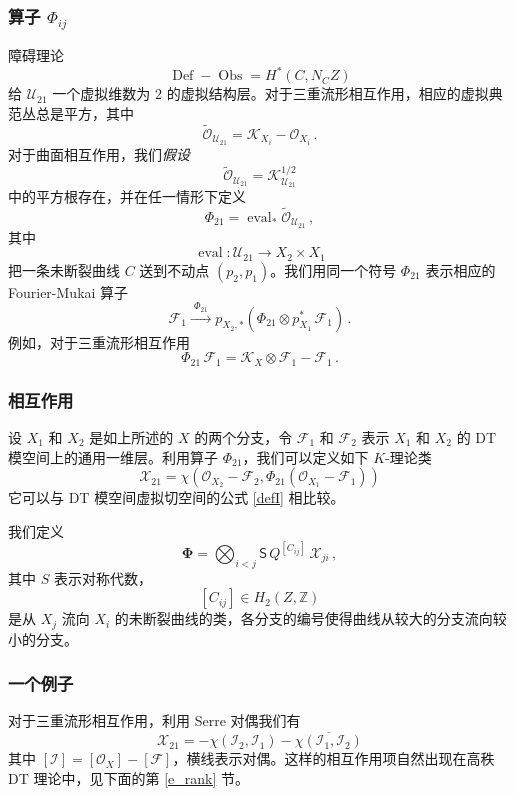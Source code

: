 \documentclass[12pt]{article}
\newcommand{\Z}{\mathbb{Z}}
\newcommand{\cO}{\mathscr{O}}
\DeclareMathOperator{\Def}{Def}
\DeclareMathOperator{\Obs}{Obs}
\DeclareMathOperator{\eval}{eval}
\newcommand{\cF}{\mathscr{F}}
\newcommand{\cI}{\mathscr{I}}
\newcommand{\cU}{\mathscr{U}}
\newcommand{\cX}{\mathscr{X}}
\newcommand{\tO}{\widetilde{\mathscr{O}}}
\newcommand{\bS}{\mathsf{S}}
\newcommand{\bPhi}{\boldsymbol{\Phi}}
\newcommand{\cK}{\mathscr{K}}
\theoremstyle{definition}
\begin{document}
\subsubsection{算子 $\Phi_{ij}$}

障碍理论
$$
\Def - \Obs = H^*(C,N_C Z)
$$
给 $\cU_{21}$ 一个虚拟维数为 $2$ 的虚拟结构层。对于三重流形相互作用，相应的虚拟典范丛总是平方，其中
$$
\tO_{\cU_{21}} = \cK_{X_i}- \cO_{X_i} \,.
$$
对于曲面相互作用，我们\emph{假设}
$$
\tO_{\cU_{21}}  = \cK^{1/2}_{\cU_{21}}
$$
中的平方根存在，并在任一情形下定义
$$
\Phi_{21} = \eval_*  \tO_{\cU_{21}} \,,
$$
其中
$$
\eval: \cU_{21} \to X_2 \times X_1
$$
把一条未断裂曲线 $C$ 送到不动点 $(p_2,p_1)$。我们用同一个符号 $\Phi_{21}$ 表示相应的 Fourier-Mukai 算子
$$
\cF_1 \xrightarrow{\,\,\Phi_{21}\,\,} p_{X_2,*}
\left(\Phi_{21} \otimes
p_{X_1}^* \, \cF_1 \right) \,.
$$
例如，对于三重流形相互作用
$$
\Phi_{21} \, \cF_1 = \cK_X \otimes \cF_1 - \cF_1 \,.
$$

\subsubsection{相互作用}\label{s_inter}

设 $X_1$ 和 $X_2$ 是如上所述的 $X$ 的两个分支，令 $\cF_1$ 和 $\cF_2$ 表示 $X_1$ 和 $X_2$ 的 DT 模空间上的通用一维层。利用算子 $\Phi_{21}$，我们可以定义如下 $K$-理论类
\begin{equation}
\cX_{21} = \chi(\cO_{X_2}-\cF_2, \Phi_{21} (\cO_{X_1}-\cF_1)) \label{defX21}
\end{equation}
它可以与 DT 模空间虚拟切空间的公式 \eqref{defI} 相比较。

我们定义
\begin{equation}
\bPhi = \bigotimes_{i<j} \bS \, Q^{[C_{ij}]} \, \cX_{ji}\,,
\label{defbPhi}
\end{equation}
其中 $S$ 表示对称代数，
$$
[C_{ij}] \in H_2(Z,\Z)
$$
是从 $X_j$ 流向 $X_i$ 的未断裂曲线的类，各分支的编号使得曲线从较大的分支流向较小的分支。

\subsubsection{一个例子}

对于三重流形相互作用，利用 Serre 对偶我们有
\begin{equation}
  \cX_{21} = -
\chi(\cI_2,\cI_1) - \overline{\chi(\cI_1,\cI_2)} \label{XA}
\end{equation}
其中 $[\cI]=[\cO_X] - [\cF]$，横线表示对偶。这样的相互作用项自然出现在高秩 DT 理论中，见下面的第 \ref{e_rank} 节。
\end{document}

